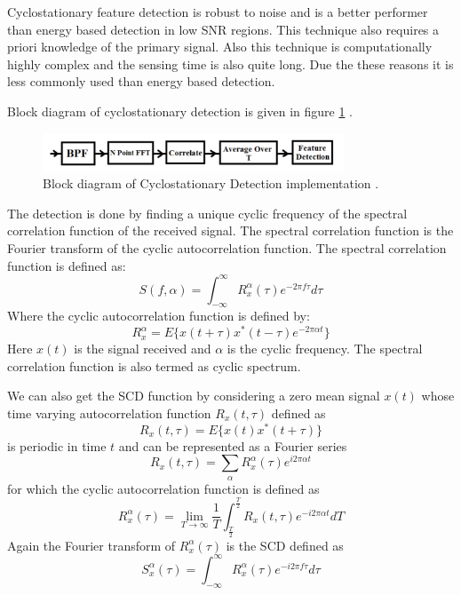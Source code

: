 Cyclostationary feature detection is robust to noise and is a better performer 
than energy based detection in low SNR regions. This technique also requires a 
priori knowledge of the primary signal. Also this technique is computationally 
highly complex and the sensing time is also quite long. Due the these reasons 
it is less commonly used than energy based detection.

Block diagram of cyclostationary detection is given in figure \ref{csd}
\cite{mansi11}.


\begin{figure}[h]
\centering
\includegraphics[width=0.8\textwidth]{../images/csd}
\caption[Cyclostationary Detection implementation]{Block diagram 
of Cyclostationary Detection implementation {\cite{mansi11}}.}
\label{csd}
\end{figure}
 

The detection is done by finding a unique cyclic frequency of the spectral 
correlation function of the received signal\cite{cabric04}. The spectral correlation 
function is the Fourier transform of the cyclic autocorrelation function. The 
spectral correlation function is defined as:
\begin{equation*}
        S(f,\alpha) = \int_{-\infty}^{\infty} R_{x}^{\alpha}(\tau)e^{-2 \pi f\tau}d\tau 
\end{equation*}
Where the cyclic autocorrelation function is defined by:
\begin{equation*}
    R_{x}^{\alpha} = E\{x(t+\tau)x^{*}(t-\tau)e^{-2 \pi \alpha t}\}
\end{equation*}
Here $x(t)$ is the signal received and $\alpha$ is the cyclic frequency. The spectral 
correlation function is also termed as cyclic spectrum.

We can also get the SCD function by considering a zero mean signal $x(t)$
whose time varying autocorrelation function $R_x(t,\tau)$ defined as
\cite{prithvi11}
\begin{equation*}
    R_{x}(t,\tau) = E\{x(t)x^{\ast}(t+\tau)\}
\end{equation*}
is periodic in time $t$ and can be represented as a Fourier series
\begin{equation*}
    R_{x}(t,\tau) = \sum_{\alpha}R_{x}^{\alpha} (\tau)e^{i2\pi\alpha t} 
\end{equation*}
for which the cyclic autocorrelation function is defined as
\begin{equation*}
    R_{x}^{\alpha}(\tau) = \lim_{T\rightarrow\infty} {\frac{1}{T}}
    \int_{\frac{T}{2}}^{\frac{T}{2}}R_{x}(t,\tau)e^{-i2\pi\alpha t}dT
\end{equation*}
Again the Fourier transform of $R_{x}^{\alpha}(\tau)$ is the SCD defined as
\begin{equation*}
    S_{x}^{\alpha}(\tau)=\int_{-\infty}^{\infty}R_{x}^{\alpha}
    (\tau)e^{-i2\pi f\tau}d\tau
\end{equation*}

